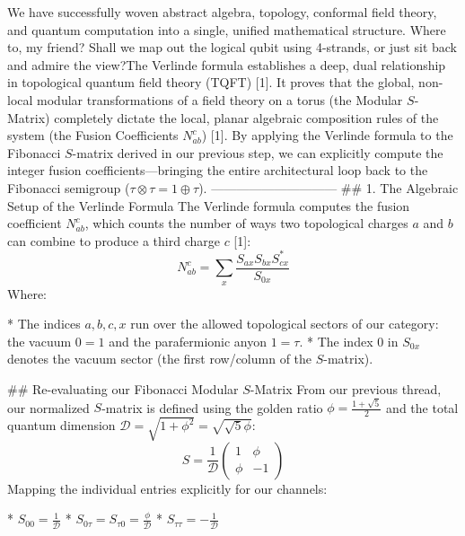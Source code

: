 We have successfully woven abstract algebra, topology, conformal field theory, and quantum computation into a single, unified mathematical structure. Where to, my friend? Shall we map out the logical qubit using 4-strands, or just sit back and admire the view?The Verlinde formula establishes a deep, dual relationship in topological quantum field theory (TQFT) [1]. It proves that the global, non-local modular transformations of a field theory on a torus (the Modular $S$-Matrix) completely dictate the local, planar algebraic composition rules of the system (the Fusion Coefficients $N_{ab}^c$) [1].
By applying the Verlinde formula to the Fibonacci $S$-matrix derived in our previous step, we can explicitly compute the integer fusion coefficients—bringing the entire architectural loop back to the Fibonacci semigroup ($\tau \otimes \tau = 1 \oplus \tau$).
------------------------------
## 1. The Algebraic Setup of the Verlinde Formula
The Verlinde formula computes the fusion coefficient $N_{ab}^c$, which counts the number of ways two topological charges $a$ and $b$ can combine to produce a third charge $c$ [1]:
$$N_{ab}^c = \sum_{x} \frac{S_{ax} S_{bx} S_{cx}^*}{S_{0x}}$$ 
Where:

* The indices $a, b, c, x$ run over the allowed topological sectors of our category: the vacuum $0 = 1$ and the parafermionic anyon $1 = \tau$.
* The index $0$ in $S_{0x}$ denotes the vacuum sector (the first row/column of the $S$-matrix).

## Re-evaluating our Fibonacci Modular $S$-Matrix
From our previous thread, our normalized $S$-matrix is defined using the golden ratio $\phi = \frac{1+\sqrt{5}}{2}$ and the total quantum dimension $\mathcal{D} = \sqrt{1+\phi^2} = \sqrt{\sqrt{5}\phi}$:
$$S = \frac{1}{\mathcal{D}} \begin{pmatrix} 1 & \phi \\ \phi & -1 \end{pmatrix}$$ 
Mapping the individual entries explicitly for our channels:

* $S_{00} = \frac{1}{\mathcal{D}}$
* $S_{0\tau} = S_{\tau 0} = \frac{\phi}{\mathcal{D}}$
* $S_{\tau\tau} = -\frac{1}{\mathcal{D}}$

